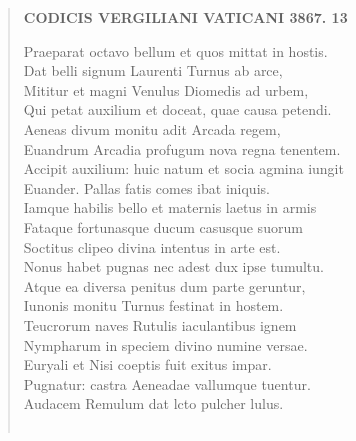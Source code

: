 \documentclass[11pt, a4paper]{report}
\begin{document}
\begin{verse}
    \begin{center} \textbf{CODICIS VERGILIANI VATICANI 3867. 13} \end{center}Praeparat octavo bellum  \lbrack et \rbrack  quos mittat in hostis. \\ Dat belli signum Laurenti Turnus ab arce, \\ Mititur et magni Venulus Diomedis ad urbem, \\ Qui petat auxilium et doceat, quae causa petendi. \\ Aeneas divum monitu adit Arcada regem, \\ Euandrum Arcadia profugum nova regna tenentem. \\ Accipit auxilium: huic natum et socia agmina iungit \\ Euander. Pallas fatis comes ibat iniquis. \\ Iamque habilis bello et maternis laetus in armis \\ Fataque fortunasque ducum casusque suorum \\ Soctitus clipeo divina intentus in arte est. \\ Nonus habet pugnas nec adest dux ipse tumultu. \\ Atque ea diversa penitus dum parte geruntur, \\ Iunonis monitu Turnus festinat in hostem. \\ Teucrorum naves Rutulis iaculantibus ignem \\ Nympharum in speciem divino numine versae. \\ Euryali et Nisi coeptis fuit exitus impar. \\ Pugnatur: castra Aeneadae vallumque tuentur. \\ Audacem Remulum dat lcto pulcher lulus. \\ 
        ﻿\pagebreak 

\end{verse}
\end{document}
